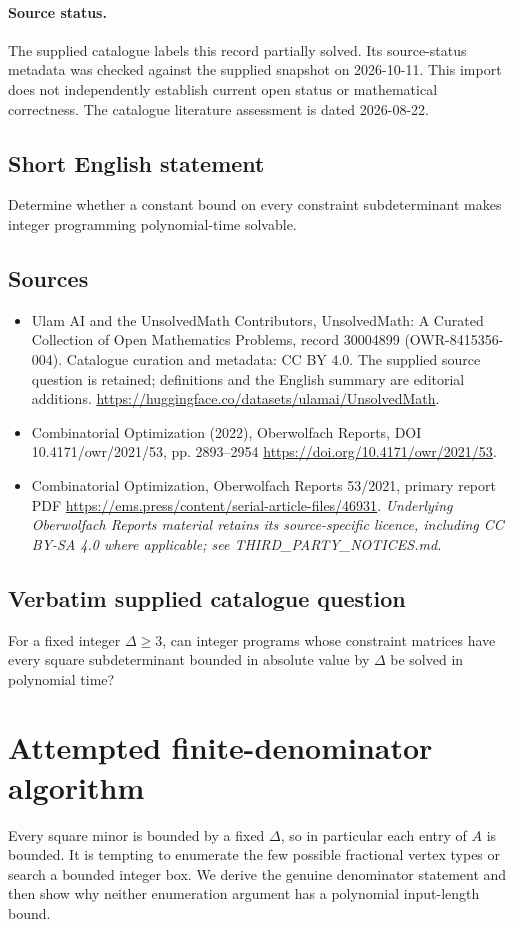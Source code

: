 \documentclass[11pt]{article}
\begin{document}
\paragraph{Source status.}
The supplied catalogue labels this record partially solved. Its source-status metadata was checked against the supplied snapshot on 2026-10-11. This import does not independently establish current open status or mathematical correctness. The catalogue literature assessment is dated 2026-08-22.
\subsection{Short English statement}
Determine whether a constant bound on every constraint subdeterminant makes integer programming polynomial-time solvable.
\subsection{Sources}
\begin{itemize}
\item[S1] Ulam AI and the UnsolvedMath Contributors, UnsolvedMath: A Curated Collection of Open Mathematics Problems, record 30004899 (OWR-8415356-004). Catalogue curation and metadata: CC BY 4.0. The supplied source question is retained; definitions and the English summary are editorial additions.
\url{https://huggingface.co/datasets/ulamai/UnsolvedMath}.
\item[S2] Combinatorial Optimization (2022), Oberwolfach Reports, DOI 10.4171/owr/2021/53, pp. 2893--2954
\url{https://doi.org/10.4171/owr/2021/53}.
\item[S3] Combinatorial Optimization, Oberwolfach Reports 53/2021, primary report PDF
\url{https://ems.press/content/serial-article-files/46931}.
\textit{Underlying Oberwolfach Reports material retains its source-specific licence, including CC BY-SA 4.0 where applicable; see THIRD\_PARTY\_NOTICES.md.}
\end{itemize}
\subsection{Verbatim supplied catalogue question}
For a fixed integer $\Delta\geq3$, can integer programs whose constraint matrices have every square subdeterminant bounded in absolute value by $\Delta$ be solved in polynomial time?

\section{Attempted finite-denominator algorithm}
Every square minor is bounded by a fixed $\Delta$, so in particular
each entry of $A$ is bounded. It is tempting to enumerate the
few possible fractional vertex types or search a bounded integer box.
We derive the genuine denominator statement and then show why neither
enumeration argument has a polynomial input-length bound.
\end{document}
